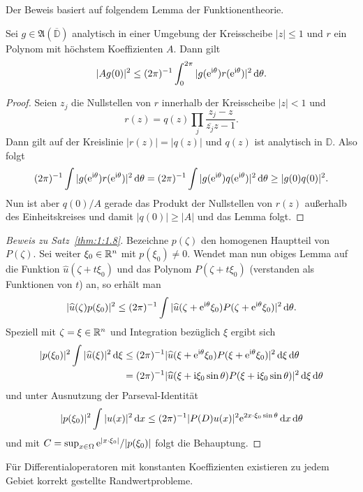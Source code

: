 Der Beweis basiert auf folgendem Lemma der Funktionentheorie. 
\begin{lem}
Sei $g\in\mathfrak A(\overline{\mathbb D})$ analytisch in einer Umgebung der Kreisscheibe $|z|\le 1$  und $r$ ein Polynom mit höchstem Koeffizienten $A$. Dann gilt
\begin{equation}
   |Ag(0)|^2 \le (2\pi)^{-1} \int_0^{2\pi} |g(\mathrm e^{\mathrm i\theta}) r(\mathrm e^{\mathrm i\theta})|^2 \,\mathrm d\theta.
\end{equation}
\end{lem}
\begin{proof}
Seien $z_j$ die Nullstellen von $r$ innerhalb der Kreisscheibe $|z|<1$ und
\begin{equation}
    r(z) = q(z) \prod_{j} \frac{z_j-z}{\overline{z_j}z-1}.
\end{equation} 
Dann gilt auf der Kreislinie $|r(z)|=|q(z)|$ und $q(z)$ ist analytisch in $\mathbb D$. Also folgt
\begin{equation}
  (2\pi)^{-1} \int  |g(\mathrm e^{\mathrm i\theta}) r(\mathrm e^{\mathrm i\theta})|^2 \,\mathrm d\theta = (2\pi)^{-1} \int  |g(\mathrm e^{\mathrm i\theta}) q(\mathrm e^{\mathrm i\theta})|^2 \,\mathrm d\theta \ge |g(0)q(0)|^2.
\end{equation}
Nun ist aber $q(0)/A$ gerade das Produkt der Nullstellen von $r(z)$ außerhalb des Einheitskreises und damit $|q(0)|\ge |A|$ und das Lemma folgt.
\end{proof}

\begin{proof}[Beweis zu Satz~\ref{thm:1:1.8}]
Bezeichne $p(\zeta)$ den homogenen Hauptteil von $P(\zeta)$. Sei weiter $\xi_0\in\mathbb R^n$ mit $p(\xi_0)\ne0$. Wendet man nun obiges Lemma auf die Funktion
$\widehat u(\zeta+ t\xi_0)$ und das Polynom $P(\zeta+t\xi_0)$ (verstanden als Funktionen von $t$) an, so erhält man
\begin{equation}
   |\widehat u(\zeta) p(\xi_0)|^2 \le (2\pi)^{-1} \int |\widehat u(\zeta+\mathrm e^{\mathrm i\theta} \xi_0) P(\zeta+\mathrm e^{\mathrm i\theta}\xi_0)|^2 \,\mathrm d\theta.
\end{equation}
Speziell mit $\zeta=\xi\in\mathbb R^n$ und Integration bezüglich $\xi$ ergibt sich
\begin{align}
   |p(\xi_0)|^2 \int |\widehat u(\xi)|^2 \,\mathrm d\xi &\le (2\pi)^{-1} \relax |\widehat u(\xi+\mathrm e^{\mathrm i\theta}\xi_0) P(\xi+\mathrm e^{\mathrm i\theta}\xi_0)|^2 \,\mathrm d\xi\,\mathrm d\theta \notag\\
   &= (2\pi)^{-1} \relax |\widehat u(\xi+\mathrm i\xi_0\sin\theta) P(\xi+\mathrm i\xi_0\sin\theta)|^2 \,\mathrm d\xi\,\mathrm d\theta
\end{align} 
und unter Ausnutzung der Parseval-Identität
\begin{equation}
   |p(\xi_0)|^2 \int |u(x)|^2\,\mathrm d x \le (2\pi)^{-1} \relax |P(D) u(x)|^2 \mathrm e^{2x\cdot\xi_0 \sin\theta} \,\mathrm d x\,\mathrm d\theta
\end{equation}
und mit $C=\sup_{x\in\Omega} \mathrm e^{|x\cdot\xi_0|} /|p(\xi_0)|$ folgt die Behauptung.
\end{proof}

\begin{cor}\label{cor:1:1.10}
Für Differentialoperatoren mit konstanten Koeffizienten existieren
zu jedem Gebiet korrekt gestellte Randwertprobleme.
\end{cor}
